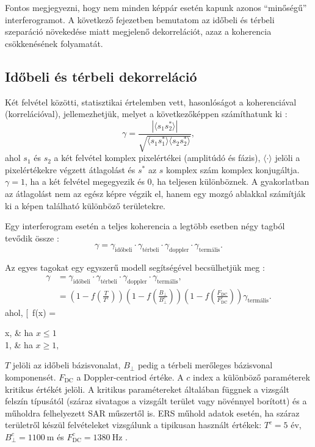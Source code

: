 \documentclass[12pt]{report}
\numberwithin{equation}{section}
\numberwithin{table}{section}
\numberwithin{figure}{section}
\begin{document}
Fontos megjegyezni, hogy nem minden képpár esetén kapunk azonos ``minőségű'' interferogramot. A következő fejezetben bemutatom az időbeli és térbeli szeparáció növekedése miatt megjelenő dekorrelációt, azaz a koherencia csökkenésének folyamatát.

\subsection{Időbeli és térbeli dekorreláció}

Két felvétel közötti, statisztikai értelemben vett, hasonlóságot a koherenciával (korrelációval), jellemezhetjük, melyet a következőképpen számíthatunk ki \cite{BurgmannInSAR}:
\[
    \gamma = \frac{|\langle s_1 s_2^* \rangle|}{\sqrt{\langle s_1 s_1^*
    \rangle \langle s_2 s_2^* \rangle}},
\]
ahol $s_1$ és $s_2$ a két felvétel komplex pixelértékei (amplitúdó és fázis), $\langle \cdot \rangle$ jelöli a pixelértékekre végzett átlagolást és $s^*$ az $s$ komplex szám komplex konjugáltja. $\gamma = 1$, ha a két felvétel megegyezik és $0$, ha teljesen különböznek. A gyakorlatban az átlagolást nem az egész képre végzik el, hanem egy mozgó ablakkal számítják ki a képen található különböző területekre.

Egy interferogram esetén a teljes koherencia a legtöbb esetben négy tagból tevődik össze \cite{HooperThesis}:
\[
    \gamma = \gamma_{\text{időbeli}} \cdot \gamma_{\text{térbeli}} \cdot \gamma_{\text{doppler}} \cdot \gamma_{\text{termális}}.
\]

Az egyes tagokat egy egyszerű modell segítségével becsülhetjük meg \cite{HooperThesis}:
\begin{align}
    \gamma &= \gamma_{\text{időbeli}} \cdot \gamma_{\text{térbeli}} \cdot \gamma_{\text{doppler}} \cdot \gamma_{\text{termális}},\\
    &= \left(1 - f \left(\frac{T}{T^c}\right)\right) \left(1 - f \left(\frac{B_{\perp}}{B^c_{\perp}}\right)\right) \left(1 - f \left(\frac{F_{\text{DC}}}{F^c_{\text{DC}}}\right)\right) \gamma_{\text{termális}}. \label{stack_model}
\end{align}
ahol,
[\
    f(x) = \begin{cases*}
            x, & ha $x \le 1$\\
            1, & ha $x \ge 1,$
            \end{cases*}
\]
$T$ jelöli az időbeli bázisvonalat, $B_{\perp}$ pedig a térbeli merőleges bázisvonal komponensét. $F_{\text{DC}}$ a Doppler-centriod értéke. A $c$ index a különböző paraméterek kritikus értékét jelöli. A kritikus paramétereket általában függnek a vizsgált felszín típusától (száraz sivatagos a vizsgált terület vagy növénnyel borított) és a műholdra felhelyezett SAR műszertől is. ERS műhold adatok esetén, ha száraz területről készül felvételeket vizsgálunk a tipikusan használt értékek: $T^c = 5\text{ év}$, $B^c_{\perp} = \SI{1100}{\meter}$ és $F^c_{\text{DC}} = \SI{1380}{\hertz}$ \cite{HooperThesis}.
\end{document}
